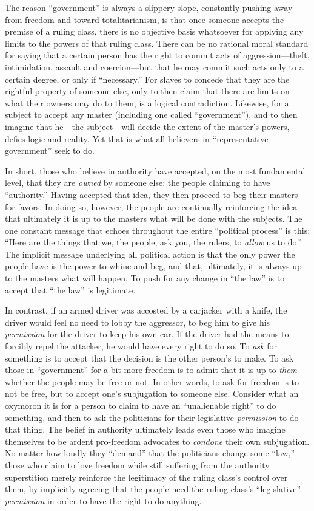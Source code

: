 \documentclass{book}
\begin{document}
The reason \enquote{government} is always a slippery slope, constantly pushing away from freedom and toward totalitarianism, is that once someone accepts the premise of a ruling class, there is no objective basis whatsoever for applying any limits to the powers of that ruling class. There can be no rational moral standard for saying that a certain person has the right to commit acts of aggression---theft, intimidation, assault and coercion---but that he may commit such acts only to a certain degree, or only if \enquote{necessary.} For slaves to concede that they are the rightful property of someone else, only to then claim that there are limits on what their owners may do to them, is a logical contradiction. Likewise, for a subject to accept any master (including one called \enquote{government}), and to then imagine that he---the subject---will decide the extent of the master's powers, defies logic and reality. Yet that is what all believers in \enquote{representative government} seek to do.

In short, those who believe in authority have accepted, on the most fundamental level, that they are \emph{owned} by someone else: the people claiming to have \enquote{authority.} Having accepted that idea, they then proceed to beg their masters for favors. In doing so, however, the people are continually reinforcing the idea that ultimately it is up to the masters what will be done with the subjects. The one constant message that echoes throughout the entire \enquote{political process} is this: \enquote{Here are the things that we, the people, ask you, the rulers, to \emph{allow} us to do.} The implicit message underlying all political action is that the only power the people have is the power to whine and beg, and that, ultimately, it is always up to the masters what will happen. To push for any change in \enquote{the law} is to accept that \enquote{the law} is legitimate.

In contrast, if an armed driver was accosted by a carjacker with a knife, the driver would feel no need to lobby the aggressor, to beg him to give his \emph{permission} for the driver to keep his own car. If the driver had the means to forcibly repel the attacker, he would have every right to do so. To \emph{ask} for something is to accept that the decision is the other person's to make. To ask those in \enquote{government} for a bit more freedom is to admit that it is up to \emph{them} whether the people may be free or not. In other words, to ask for freedom is to not be free, but to accept one's subjugation to someone else. Consider what an oxymoron it is for a person to claim to have an \enquote{unalienable right} to do something, and then to ask the politicians for their legislative \emph{permission} to do that thing. The belief in authority ultimately leads even those who imagine themselves to be ardent pro-freedom advocates to \emph{condone} their own subjugation. No matter how loudly they \enquote{demand} that the politicians change some \enquote{law,} those who claim to love freedom while still suffering from the authority superstition merely reinforce the legitimacy of the ruling class's control over them, by implicitly agreeing that the people need the ruling class's \enquote{legislative} \emph{permission} in order to have the right to do anything.
\end{document}
